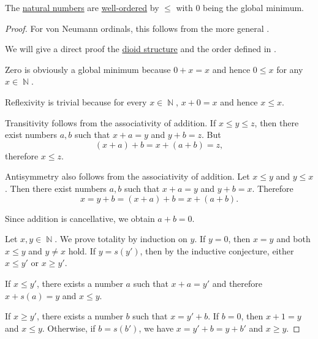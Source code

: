 \begin{proposition}\label{thm:natural_numbers_are_well_ordered}
  The \hyperref[def:natural_numbers]{natural numbers} are \hyperref[def:well_ordered_set]{well-ordered} by \hyperref[def:natural_number_ordering]{\( \leq \)} with \( 0 \) being the global minimum.
\end{proposition}
\begin{proof}
  For von Neumann ordinals, this follows from the more general .

  We will give a direct proof the \hyperref[thm:natural_numbers_form_dioid]{dioid structure} and the order defined in .

  Zero is obviously a global minimum because \( 0 + x = x \) and hence \( 0 \leq x \) for any \( x \in \BbbN \).

   Reflexivity is trivial because for every \( x \in \BbbN \), \( x + 0 = x \) and hence \( x \leq x \).

   Transitivity follows from the associativity of addition. If \( x \leq y \leq z \), then there exist numbers \( a, b \) such that \( x + a = y \) and \( y + b = z \). But
  \begin{equation*}
    (x + a) + b = x + (a + b) = z,
  \end{equation*}
  therefore \( x \leq z \).

   Antisymmetry also follows from the associativity of addition. Let \( x \leq y \) and \( y \leq x \). Then there exist numbers \( a, b \) such that \( x + a = y \) and \( y + b = x \). Therefore
  \begin{equation*}
    x = y + b = (x + a) + b = x + (a + b).
  \end{equation*}

  Since addition is cancellative, we obtain \( a + b = 0 \).

   Let \( x, y \in \BbbN \). We prove totality by induction on \( y \). If \( y = 0 \), then \( x = y \) and both \( x \leq y \) and \( y \neq x \) hold. If \( y = s(y') \), then by the inductive conjecture, either \( x \leq y' \) or \( x \geq y' \).

  If \( x \leq y' \), there exists a number \( a \) such that \( x + a = y' \) and therefore \( x + s(a) = y \) and \( x \leq y \).

  If \( x \geq y' \), there exists a number \( b \) such that \( x = y' + b \). If \( b = 0 \), then \( x + 1 = y \) and \( x \leq y \). Otherwise, if \( b = s(b') \), we have \( x = y' + b = y + b' \) and \( x \geq y \).


\end{proof}
